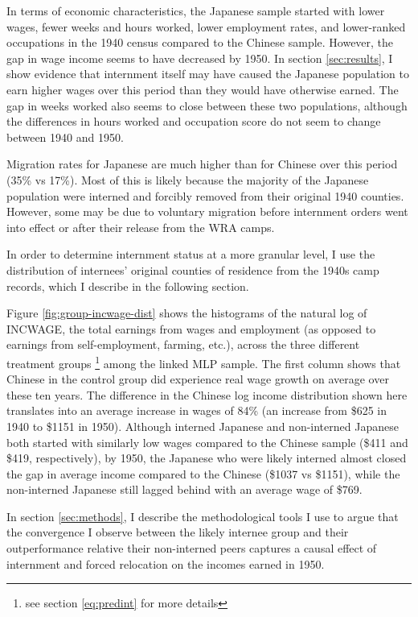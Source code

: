 In terms of economic characteristics,
the Japanese sample started with lower wages, fewer weeks and hours worked,
lower employment rates,
and lower-ranked occupations in the 1940 census compared to the Chinese sample.
However, the gap in wage income seems to have decreased by 1950.
In section \ref{sec:results}, I show evidence that 
internment itself may have caused the Japanese population to earn higher wages
over this period than they would have otherwise earned.
The gap in weeks worked also seems to close between these two populations,
although the differences in hours worked and occupation score
do not seem to change between 1940 and 1950.

Migration rates for Japanese are much higher than for Chinese over this period
(35\% vs 17\%).
Most of this is likely because the majority of the Japanese population 
were interned and forcibly removed from their original 1940 counties.
However, some may be due to voluntary migration
before internment orders went into effect
or after their release from the WRA camps.

In order to determine internment status at a more granular level,
I use the distribution of internees' original counties of residence
from the 1940s camp records,
which I describe in the following section.



Figure \ref{fig:group-incwage-dist} shows the histograms of 
the natural log of INCWAGE,
the total earnings from wages and employment
(as opposed to earnings from self-employment, farming, etc.),
across the three different treatment groups
\footnote{see section \ref{eq:predint} for more details}
among the linked MLP sample.
The first column shows that Chinese in the control group did experience
real wage growth on average over these ten years.
The difference in the Chinese log income distribution shown here
translates into an average increase in wages of 84\%
(an increase from \$625 in 1940 to \$1151 in 1950).
Although interned Japanese and non-interned Japanese
both started with similarly low wages compared to the Chinese sample
(\$411 and \$419, respectively),
by 1950, the Japanese who were likely interned almost closed the gap
in average income compared to the Chinese (\$1037 vs \$1151),
while the non-interned Japanese still lagged behind
with an average wage of \$769.

In section \ref{sec:methods}, I describe the methodological tools I use
to argue that the convergence I observe between the likely internee group
and their outperformance relative their non-interned peers
captures a causal effect of internment and forced relocation
on the incomes earned in 1950.

